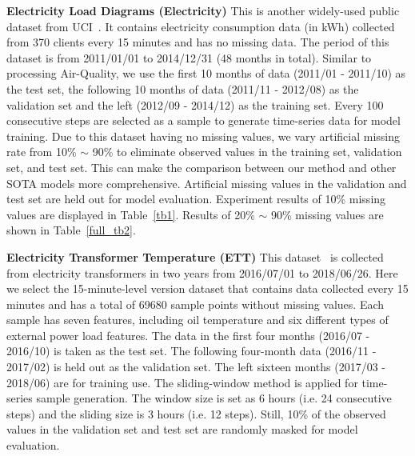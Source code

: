 \documentclass{article}
\begin{document}
\textbf{Electricity Load Diagrams (Electricity)} \hspace{1em} 
This is another widely-used public dataset from UCI~\cite{Dua2017UCI}. It contains electricity consumption data (in kWh) collected from 370 clients every 15 minutes and has no missing data. The period of this dataset is from 2011/01/01 to 2014/12/31 (48 months in total). Similar to processing Air-Quality, we use the first 10 months of data (2011/01 - 2011/10) as the test set, the following 10 months of data (2011/11 - 2012/08) as the validation set and the left (2012/09 - 2014/12) as the training set. Every 100 consecutive steps are selected as a sample to generate time-series data for model training. Due to this dataset having no missing values, we vary artificial missing rate from 10\% $\sim$ 90\% to eliminate observed values in the training set, validation set, and test set. This can make the comparison between our method and other SOTA models more comprehensive. Artificial missing values in the validation and test set are held out for model evaluation. Experiment results of 10\% missing values are displayed in Table~\ref{tb1}. Results of 20\% $\sim$ 90\% missing values are shown in Table~\ref{full_tb2}.

\textbf{Electricity Transformer Temperature (ETT)} \hspace{1em}
This dataset~\cite{Zhou2021informer} is collected from electricity transformers in two years from 2016/07/01 to 2018/06/26. Here we select the 15-minute-level version dataset that contains data collected every 15 minutes and has a total of 69680 sample points without missing values. Each sample has seven features, including oil temperature and six different types of external power load features. The data in the first four months (2016/07 - 2016/10) is taken as the test set. The following four-month data (2016/11 - 2017/02) is held out as the validation set. The left sixteen months (2017/03 - 2018/06) are for training use. The sliding-window method is applied for time-series sample generation. The window size is set as 6 hours (i.e. 24 consecutive steps) and the sliding size is 3 hours (i.e. 12 steps). Still, 10\% of the observed values in the validation set and test set are randomly masked for model evaluation.
\end{document}
